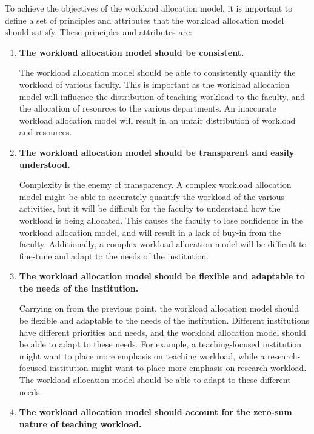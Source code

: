 To achieve the objectives of the workload allocation model, it is important to define a set of principles and attributes that the workload allocation model should satisfy. These principles and attributes are:

\begin{enumerate}

  \item \textbf{The workload allocation model should be consistent.}

        The workload allocation model should be able to consistently quantify the workload of various faculty. This is important as the workload allocation model will influence the distribution of teaching workload to the faculty, and the allocation of resources to the various departments. An inaccurate workload allocation model will result in an unfair distribution of workload and resources.

  \item \textbf{The workload allocation model should be transparent and easily understood.}

        Complexity is the enemy of transparency. A complex workload allocation model might be able to accurately quantify the workload of the various activities, but it will be difficult for the faculty to understand how the workload is being allocated. This causes the faculty to lose confidence in the workload allocation model, and will result in a lack of buy-in from the faculty. Additionally, a complex workload allocation model will be difficult to fine-tune and adapt to the needs of the institution.

  \item \textbf{The workload allocation model should be flexible and adaptable to the needs of the institution.}

        Carrying on from the previous point, the workload allocation model should be flexible and adaptable to the needs of the institution. Different institutions have different priorities and needs, and the workload allocation model should be able to adapt to these needs. For example, a teaching-focused institution might want to place more emphasis on teaching workload, while a research-focused institution might want to place more emphasis on research workload. The workload allocation model should be able to adapt to these different needs.

  \item \textbf{The workload allocation model should account for the zero-sum nature of teaching workload.}


\end{enumerate}

